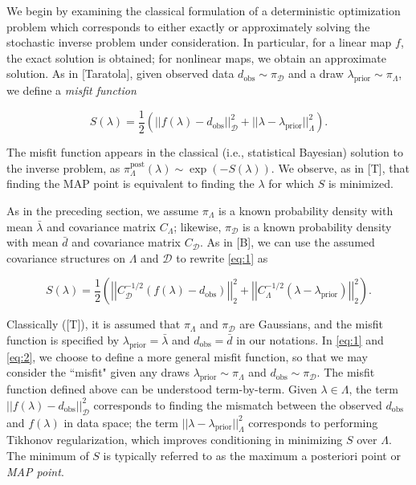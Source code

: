 \documentclass{amsart}
\begin{document}
We begin by examining the classical formulation of a deterministic optimization problem which corresponds to either exactly or approximately solving the stochastic inverse problem under consideration. In particular, for a linear map $f$, the exact solution is obtained; for nonlinear maps, we obtain an approximate solution. As in [Taratola], given observed data $d_{\text{obs}} \sim \pi_\mathcal{D}$ and a draw $\lambda_\text{prior}\sim \pi_\Lambda$, we define a \textit{misfit function}

\begin{equation} \label{eq:1}
S(\lambda)=\frac{1}{2}\left(||f(\lambda)-d_{\text{obs}}||_\mathcal{D}^2+||\lambda-\lambda_{\text{prior}}||_\Lambda^2\right).
\end{equation}

The misfit function appears in the classical (i.e., statistical Bayesian) solution to the inverse problem, as $\pi_\Lambda^\text{post}(\lambda) \sim \exp(-S(\lambda)).$ We observe, as in [T], that finding the MAP point is equivalent to finding the $\lambda$ for which $S$ is minimized.

As in the preceding section, we assume $\pi_\Lambda$ is a known probability density with mean $\bar{\lambda}$ and covariance matrix $C_\Lambda$; likewise, $\pi_\mathcal{D}$ is a known probability density with mean $\bar{d}$ and covariance matrix $C_\mathcal{D}$. As in [B], we can use the assumed covariance structures on $\Lambda$ and $\mathcal{D}$ to rewrite \eqref{eq:1} as


\begin{equation} \label{eq:2}
S(\lambda)=\frac{1}{2}\left(\left|\left|C_\mathcal{D}^{-1/2}(f(\lambda)-d_{\text{obs}})\right|\right|_2^2+\left|\left|C_\Lambda^{-1/2}(\lambda-\lambda_{\text{prior}})\right|\right|_2^2\right).
\end{equation} 

Classically ([T]), it is assumed that $\pi_\Lambda$ and $\pi_\mathcal{D}$ are Gaussians, and the misfit function is specified by $\lambda_{\text{prior}}=\bar{\lambda}$ and $d_{\text{obs}}=\bar{d}$ in our notations. In \eqref{eq:1} and \eqref{eq:2}, we choose to define a more general misfit function, so that we may consider the ``misfit" given any draws $\lambda_{\text{prior}}\sim \pi_\Lambda$ and $d_\text{obs} \sim \pi_\mathcal{D}$. The misfit function defined above can be understood term-by-term. Given $\lambda \in \Lambda$, the term $||f(\lambda)-d_{\text{obs}}||_\mathcal{D}^2$ corresponds to finding the mismatch between the observed $d_\text{obs}$ and $f(\lambda)$ in data space; the term $||\lambda-\lambda_{\text{prior}}||_\Lambda^2$ corresponds to performing Tikhonov regularization, which improves conditioning in minimizing $S$ over $\Lambda$. The minimum of $S$ is typically referred to as the maximum a posteriori point or \textit{MAP point}.
\end{document}
